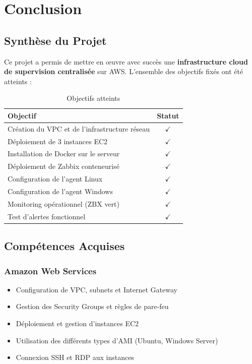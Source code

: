 \chapter{Conclusion}
\label{chap:conclusion}

\section{Synthèse du Projet}

Ce projet a permis de mettre en œuvre avec succès une \textbf{infrastructure cloud de supervision centralisée} sur AWS. L'ensemble des objectifs fixés ont été atteints :

\begin{table}[H]
\centering
\caption{Objectifs atteints}
\label{tab:objectives-achieved}
\begin{tabular}{|l|c|}
\hline
\textbf{Objectif} & \textbf{Statut} \\
\hline
Création du VPC et de l'infrastructure réseau & $\checkmark$ \\
\hline
Déploiement de 3 instances EC2 & $\checkmark$ \\
\hline
Installation de Docker sur le serveur & $\checkmark$ \\
\hline
Déploiement de Zabbix conteneurisé & $\checkmark$ \\
\hline
Configuration de l'agent Linux & $\checkmark$ \\
\hline
Configuration de l'agent Windows & $\checkmark$ \\
\hline
Monitoring opérationnel (ZBX vert) & $\checkmark$ \\
\hline
Test d'alertes fonctionnel & $\checkmark$ \\
\hline
\end{tabular}
\end{table}

\section{Compétences Acquises}

\subsection{Amazon Web Services}

\begin{itemize}
    \item Configuration de VPC, subnets et Internet Gateway
    \item Gestion des Security Groups et règles de pare-feu
    \item Déploiement et gestion d'instances EC2
    \item Utilisation des différents types d'AMI (Ubuntu, Windows Server)
    \item Connexion SSH et RDP aux instances
\end{itemize}

